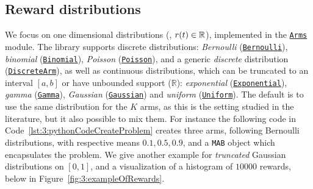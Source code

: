 \subsection{Reward distributions}
%
We focus on one dimensional distributions (\ie, $r(t)\in\mathbb{R}$), implemented in the \texttt{\href{https://smpybandits.github.io/docs/Arms.html}{Arms}} module.
The library supports discrete distributions: \emph{Bernoulli} (\texttt{\href{https://smpybandits.github.io/docs/Arms.Bernoulli.html}{Bernoulli}}), \emph{binomial} (\texttt{\href{https://smpybandits.github.io/docs/Arms.Binomial.html}{Binomial}}), \emph{Poisson} (\texttt{\href{https://smpybandits.github.io/docs/Arms.Poisson.html}{Poisson}}), and a generic \emph{discrete} distribution (\texttt{\href{https://smpybandits.github.io/docs/Arms.DiscreteArm.html}{DiscreteArm}}),
as well as continuous distributions,
which can be truncated to an interval $[a,b]$ or have unbounded support ($\mathbb{R}$):
\emph{exponential} (\texttt{\href{https://smpybandits.github.io/docs/Arms.Exponential.html}{Exponential}}), \emph{gamma} (\texttt{\href{https://smpybandits.github.io/docs/Arms.Gamma.html}{Gamma}}), \emph{Gaussian} (\texttt{\href{https://smpybandits.github.io/docs/Arms.Gaussian.html}{Gaussian}}) and \emph{uniform} (\texttt{\href{https://smpybandits.github.io/docs/Arms.Uniform.html}{Uniform}}).
%
The default is to use the same distribution for the $K$ arms, as this is the setting studied in the literature,
but it also possible to mix them.
%
For instance the following code in Code~\ref{lst:3:pythonCodeCreateProblem} creates three arms, following Bernoulli distributions, with respective means $0.1, 0.5, 0.9$, and a \texttt{MAB} object which encapsulates the problem.
We give another example for \emph{truncated} Gaussian distributions on $[0,1]$, and a visualization of a histogram of $10000$ rewards, below in Figure~\ref{fig:3:exampleOfRewards}.

